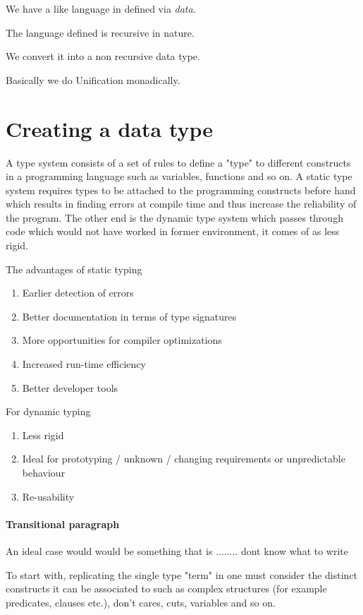 \documentclass[thesis-solanki.tex]{subfiles}
\begin{document}
We have a  like language in  defined via \textit{data}.

The language defined is recursive in nature. 

We convert it into a non recursive data type.


Basically we do Unification monadically.

  


\section{Creating a data type}

A type system consists of a set of rules to define a "type" to different constructs in a programming language such as variables, functions 
and so on. A static type system requires types to be attached to the programming constructs before hand which results in finding errors at 
compile time and thus increase the reliability of the program. The other end is the dynamic type system which passes through code which 
would not have worked in former environment, it comes of as less rigid.

The advantages of static typing \cite{meijer2004static}
\begin{enumerate}
\item Earlier detection of errors
\item Better documentation in terms of type signatures
\item More opportunities for compiler optimizations
\item Increased run-time efficiency
\item Better developer tools 
\end{enumerate}          

For dynamic typing
\begin{enumerate}
\item Less rigid
\item Ideal for prototyping / unknown / changing requirements or unpredictable behaviour 
\item Re-usability  
\end{enumerate}

\paragraph{Transitional paragraph}
An ideal case would would be something that is ........ dont know what to write


To start with, replicating the single type "term" in  one must consider the distinct constructs it can be associated to 
such as complex structures (for example predicates, clauses etc.), don't cares, cuts, variables and so on.
\end{document}
